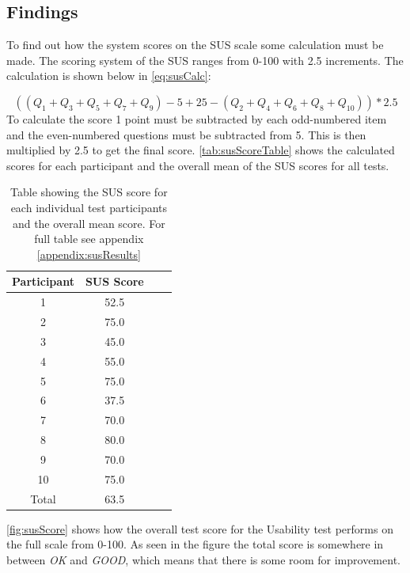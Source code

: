 \subsection{Findings}
To find out how the system scores on the SUS scale some calculation must be made. The scoring system of the SUS ranges from 0-100 with 2.5 increments. The calculation is shown below in \autoref{eq:susCalc}:

\begin{equation} \label{eq:susCalc}
( (Q_1+Q_3+Q_5+Q_7+Q_9)-5+25-(Q_2+Q_4+Q_6+Q_8+Q_{10}) )*2.5
\end{equation}
\linebreak
To calculate the score 1 point must be subtracted by each odd-numbered item and the even-numbered questions must be subtracted from 5. This is then multiplied by 2.5 to get the final score. \autoref{tab:susScoreTable} shows the calculated scores for each participant and the overall mean of the SUS scores for all tests.

\begin{table}[H]
	\centering
	\caption{Table showing the SUS score for each individual test participants and the overall mean score. For full table see appendix \ref{appendix:susResults}}
	\label{tab:susScoreTable}
	\begin{tabular}{|c|c|l|l|}
		\hline
		Participant & SUS Score \\ \hline
		1           & 52.5      \\ \hline
		2           & 75.0      \\ \hline
		3           & 45.0      \\ \hline
		4           & 55.0      \\ \hline
		5           & 75.0      \\ \hline
		6           & 37.5      \\ \hline
		7           & 70.0      \\ \hline
		8           & 80.0      \\ \hline
		9           & 70.0      \\ \hline
		10          & 75.0      \\ \hline
		Total       & 63.5      \\ \hline
	\end{tabular}
\end{table}

\autoref{fig:susScore} shows how the overall test score for the Usability test performs on the full scale from 0-100. As seen in the figure the total score is somewhere in between \textit{OK} and \textit{GOOD}, which means that there is some room for improvement.

